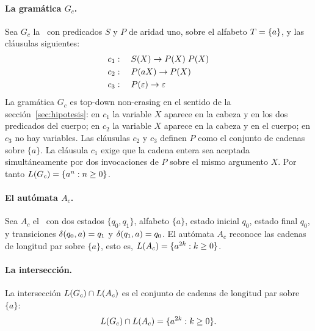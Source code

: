 \paragraph{La gramática $G_c$.} Sea $G_c$ la \PRCG\ con predicados $S$ y $P$ de aridad uno, sobre el alfabeto $T = \{a\}$, y las cláusulas siguientes:
\[
\begin{aligned}
c_1 &: \quad S(X) \to P(X) \; P(X) \\
c_2 &: \quad P(aX) \to P(X) \\
c_3 &: \quad P(\varepsilon) \to \varepsilon
\end{aligned}
\]
La gramática $G_c$ es top-down non-erasing en el sentido de la sección~\ref{sec:hipotesis}: en $c_1$ la variable $X$ aparece en la cabeza y en los dos predicados del cuerpo; en $c_2$ la variable $X$ aparece en la cabeza y en el cuerpo; en $c_3$ no hay variables. Las cláusulas $c_2$ y $c_3$ definen $P$ como el conjunto de cadenas sobre $\{a\}$. La cláusula $c_1$ exige que la cadena entera sea aceptada simultáneamente por dos invocaciones de $P$ sobre el mismo argumento $X$. Por tanto $L(G_c) = \{a^n : n \geq 0\}$.

\paragraph{El autómata $A_c$.} Sea $A_c$ el \AFD\ con dos estados $\{q_0, q_1\}$, alfabeto $\{a\}$, estado inicial $q_0$, estado final $q_0$, y transiciones $\delta(q_0, a) = q_1$ y $\delta(q_1, a) = q_0$. El autómata $A_c$ reconoce las cadenas de longitud par sobre $\{a\}$, esto es, $L(A_c) = \{a^{2k} : k \geq 0\}$.

\paragraph{La intersección.} La intersección $L(G_c) \cap L(A_c)$ es el conjunto de cadenas de longitud par sobre $\{a\}$:
\[
L(G_c) \cap L(A_c) = \{a^{2k} : k \geq 0\}.
\]

